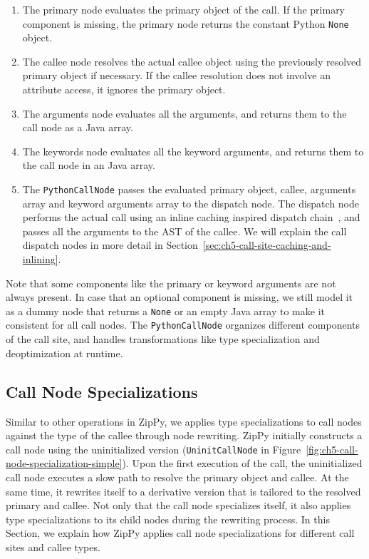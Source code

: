 \begin{enumerate}

\item The primary node evaluates the primary object of the call.
If the primary component is missing, the primary node returns the constant Python \texttt{None} object.

\item The callee node resolves the actual callee object using the previously resolved primary object if necessary.
If the callee resolution does not involve an attribute access, it ignores the primary object.

\item The arguments node evaluates all the arguments, and returns them to the call node as a Java array.

\item The keywords node evaluates all the keyword arguments, and returns them to the call node in an Java array.

\item The \texttt{PythonCallNode} passes the evaluated primary object, callee, arguments array and keyword arguments array to the dispatch node.
The dispatch node performs the actual call using an inline caching inspired dispatch chain~\cite{Deutsch1984, Holzle+1991}, and passes all the arguments to the AST of the callee.
We will explain the call dispatch nodes in more detail in Section~\ref{sec:ch5-call-site-caching-and-inlining}.

\end{enumerate}

Note that some components like the primary or keyword arguments are not always present.
In case that an optional component is missing, we still model it as a dummy node that returns a \texttt{None} or an empty Java array to make it consistent for all call nodes.
The \texttt{PythonCallNode} organizes different components of the call site, and handles transformations like type specialization and deoptimization at runtime.

\subsection{Call Node Specializations}

Similar to other operations in ZipPy, we applies type specializations to call nodes against the type of the callee through node rewriting.
ZipPy initially constructs a call node using the uninitialized version (\texttt{UninitCallNode} in Figure~\ref{fig:ch5-call-node-specialization-simple}).
Upon the first execution of the call, the uninitialized call node executes a slow path to resolve the primary object and callee.
At the same time, it rewrites itself to a derivative version that is tailored to the resolved primary and callee.
Not only that the call node specializes itself, it also applies type specializations to its child nodes during the rewriting process.
In this Section, we explain how ZipPy applies call node specializations for different call sites and callee types.

